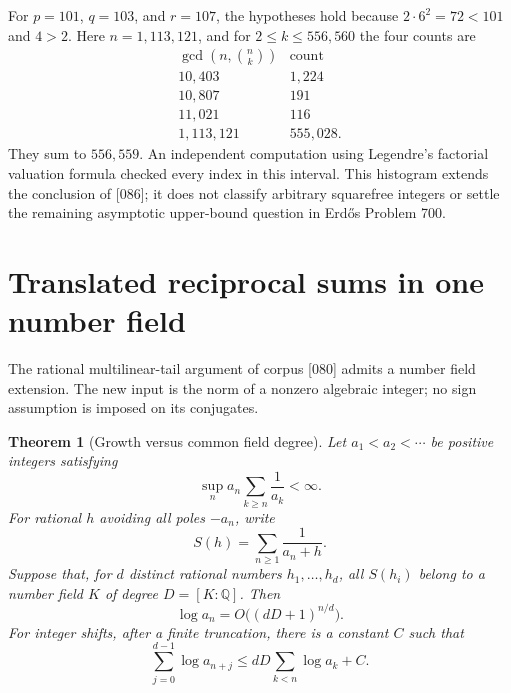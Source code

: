 \documentclass[11pt,a4paper]{article}
\newtheorem{theorem}{Theorem}[section]
\theoremstyle{definition}
\theoremstyle{remark}
\numberwithin{equation}{section}
\begin{document}
For $p=101$, $q=103$, and $r=107$, the hypotheses hold because
$2\cdot6^2=72<101$ and $4>2$.  Here $n=1,113,121$, and for
$2\le k\le556,560$ the four counts are
\[
\begin{array}{r|r}
\gcd(n,\binom nk)&\text{count}\\\hline
10,403&1,224\\
10,807&191\\
11,021&116\\
1,113,121&555,028.
\end{array}
\]
They sum to $556,559$.  An independent computation using Legendre's
factorial valuation formula checked every index in this interval.
This histogram extends the conclusion of [086]; it does not classify
arbitrary squarefree integers or settle the remaining asymptotic
upper-bound question in Erd\H{o}s Problem 700.

\section{Translated reciprocal sums in one number field}
\label{disc:fieldsection}

The rational multilinear-tail argument of corpus [080] admits a number
field extension.  The new input is the norm of a nonzero algebraic
integer; no sign assumption is imposed on its conjugates.

\begin{theorem}[Growth versus common field degree]
\label{disc:fielddegree}
Let $a_1<a_2<\cdots$ be positive integers satisfying
\begin{equation}\label{disc:taildomination}
 \sup_n a_n\sum_{k\ge n}\frac1{a_k}<\infty.
\end{equation}
For rational $h$ avoiding all poles $-a_n$, write
\[
 S(h)=\sum_{n\ge1}\frac1{a_n+h}.
\]
Suppose that, for $d$ distinct rational numbers $h_1,\ldots,h_d$,
all $S(h_i)$ belong to a number field $K$ of degree
$D=[K:\mathbb Q]$.  Then
\[
 \boxed{\log a_n=O\bigl((dD+1)^{n/d}\bigr).}
\]
For integer shifts, after a finite truncation, there is a constant $C$
such that
\[
 \sum_{j=0}^{d-1}\log a_{n+j}
 \le dD\sum_{k<n}\log a_k+C.
\]
\end{theorem}
\end{document}
